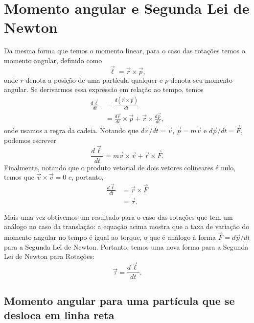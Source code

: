 \section{Momento angular e Segunda Lei de Newton}

Da mesma forma que temos o momento linear, para o caso das rotações temos o momento angular, definido como
\begin{equation}\label{Eq:DefMomAngular}
  \vec{\ell} = \vec{r}\times\vec{p},
\end{equation}
%
onde $r$ denota a posição de uma partícula qualquer e $p$ denota seu momento angular. Se derivarmos essa expressão em relação ao tempo, temos
\begin{align}
  \frac{d\vec{\ell}}{dt} &= \frac{d(\vec{r}\times\vec{p})}{dt} \\
  &= \frac{d\vec{r}}{dt}\times\vec{p} + \vec{r}\times\frac{d\vec{p}}{dt},
\end{align}
%
onde usamos a regra da cadeia. Notando que $d\vec{r}/dt = \vec{v}$, $\vec{p} = m \vec{v}$ e $d\vec{p}/dt = \vec{F}$, podemos escrever
\begin{equation}
  \frac{d\vec{\ell}}{dt} = m\vec{v}\times\vec{v} + \vec{r} \times \vec{F}.
\end{equation}
%
Finalmente, notando que o produto vetorial de dois vetores colineares é nulo, temos que $\vec{v}\times\vec{v} = 0$ e, portanto,
\begin{align}
  \frac{d\vec{\ell}}{dt} &= \vec{r} \times \vec{F} \\
  &= \vec{\tau}.
\end{align}

Mais uma vez obtivemos um resultado para o caso das rotações que tem um análogo no caso da translação: a equação acima mostra que a taxa de variação do momento angular no tempo é igual ao torque, o que é análogo à forma $\vec{F} = d\vec{p}/dt$ para a Segunda Lei de Newton. Portanto, temos uma nova forma para a Segunda Lei de Newton para Rotações:
\begin{equation}\label{Eq:SegLeiNewtonRotDLDT}
  \vec{\tau} = \frac{d\vec{\ell}}{dt}.
\end{equation}


\subsection{Momento angular para uma partícula que se desloca em linha reta}

